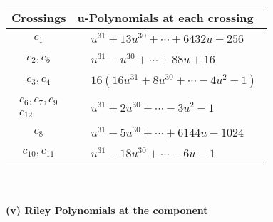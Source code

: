 \documentclass[1p]{elsarticle_modified}
\theoremstyle{definition}
\begin{document}
\begin{tabular}{m{50pt}|m{274pt}}
Crossings & \hspace{64pt}u-Polynomials at each crossing \\
\hline $$\begin{aligned}c_{1}\end{aligned}$$&$\begin{aligned}
&u^{31}+13 u^{30}+\cdots+6432 u-256
\end{aligned}$\\
\hline $$\begin{aligned}c_{2},c_{5}\end{aligned}$$&$\begin{aligned}
&u^{31}- u^{30}+\cdots+88 u+16
\end{aligned}$\\
\hline $$\begin{aligned}c_{3},c_{4}\end{aligned}$$&$\begin{aligned}
&16(16 u^{31}+8 u^{30}+\cdots-4 u^2-1)
\end{aligned}$\\
\hline $$\begin{aligned}c_{6},c_{7},c_{9}\\c_{12}\end{aligned}$$&$\begin{aligned}
&u^{31}+2 u^{30}+\cdots-3 u^2-1
\end{aligned}$\\
\hline $$\begin{aligned}c_{8}\end{aligned}$$&$\begin{aligned}
&u^{31}-5 u^{30}+\cdots+6144 u-1024
\end{aligned}$\\
\hline $$\begin{aligned}c_{10},c_{11}\end{aligned}$$&$\begin{aligned}
&u^{31}-18 u^{30}+\cdots-6 u-1
\end{aligned}$\\
\hline
\end{tabular}\\~\\
\newpage\renewcommand{\arraystretch}{1}
\flushleft \textbf{(v) Riley Polynomials at the component}\newline \\
\end{document}
